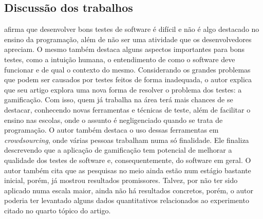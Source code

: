\documentclass[twoside,english,brazilian]{UNISINOSartigo}
\begin{document}
\subsection{Discussão dos trabalhos}
\cite{Fraser01} afirma que desenvolver bons testes de software é difícil e não é algo destacado no ensino da programação, além de não ser uma atividade que os desenvolvedores apreciam. O mesmo também destaca alguns aspectos importantes para bons testes, como a intuição humana, o entendimento de como o software deve funcionar e de qual o contexto do mesmo. Considerando os grandes problemas que podem ser causados por testes feitos de forma inadequada, o autor explica que seu artigo explora uma nova forma de resolver o problema dos testes: a gamificação. Com isso, quem já trabalha na área terá mais chances de se destacar, conhecendo novas ferramentas e técnicas de teste, além de facilitar o ensino nas escolas, onde o assunto é negligenciado quando se trata de programação. O autor também destaca o uso dessas ferramentas em \textit{crowdsourcing}, onde várias pessoas trabalham numa só finalidade. Ele finaliza descrevendo que a aplicação de gamificação tem potencial de melhorar a qualidade dos testes de software e, consequentemente, do software em geral. O autor também cita que as pesquisas no meio ainda estão num estágio bastante inicial, porém, já mostrou resultados promissores. Talvez, por não ter sido aplicado numa escala maior, ainda não há resultados concretos, porém, o autor poderia ter levantado alguns dados quantitativos relacionados ao experimento citado no quarto tópico do artigo.
\end{document}
